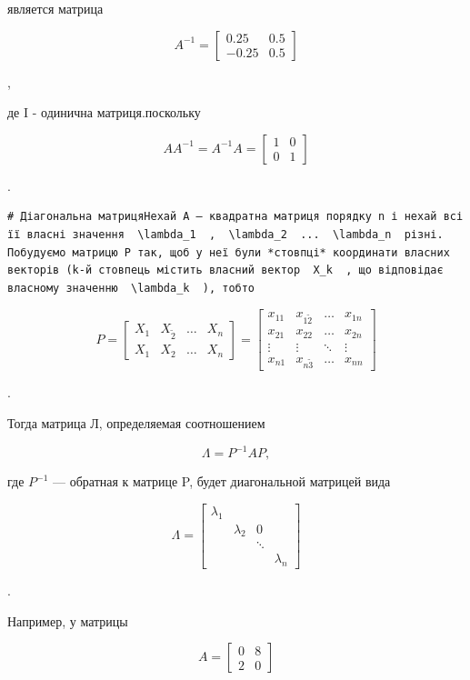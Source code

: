 \documentclass[
  ukrainian,
]{article}
\begin{document}
является матрица

\[
A^{-1} =
\begin{bmatrix} 0.25 & 0.5 \\ -0.25 & 0.5 \end{bmatrix}
\]

,

де I - одинична матриця.поскольку

\[
AA^{-1} = A^{-1}A =
\begin{bmatrix} 1 & 0 \\ 0 & 1 \end{bmatrix}
\]

.

\begin{verbatim}
# Діагональна матрицяНехай A — квадратна матриця порядку n і нехай всі її власні значення  \lambda_1  ,  \lambda_2  ...  \lambda_n  різні. Побудуємо матрицю P так, щоб у неї були *стовпці* координати власних векторів (k-й стовпець містить власний вектор  X_k  , що відповідає власному значенню  \lambda_k  ), тобто
\end{verbatim}

\[
P =
\begin{bmatrix} X_1 & X_{\tilde{2}} & \dots & X_n \\ X_{1} & X_{2} & \dots & X_n \end{bmatrix}
=
\begin{bmatrix} x_{11} & x_{1\tilde{2}} & \dots & x_{1n} \\ x_{21} & x_{22} & \dots & x_{2n} \\ \vdots & \vdots & \ddots & \vdots \\ x_{n1} & x_{n\tilde{3}} & \dots & x_{nn} \end{bmatrix}
\]

.

Тогда матрица Л, определяемая соотношением

\[
\Lambda = P^{-1}AP,
\]

где \(P^{-1}\) --- обратная к матрице P, будет диагональной матрицей
вида

\[
\Lambda =
\begin{bmatrix} \lambda_1 & & & \\ & \lambda_2 & 0 & \\ & & \ddots & \\ & & & \lambda_n \end{bmatrix}
\]

.

Например, у матрицы

\[
A =
\begin{bmatrix} 0 & 8 \\ 2 & 0 \end{bmatrix}
\]
\end{document}

